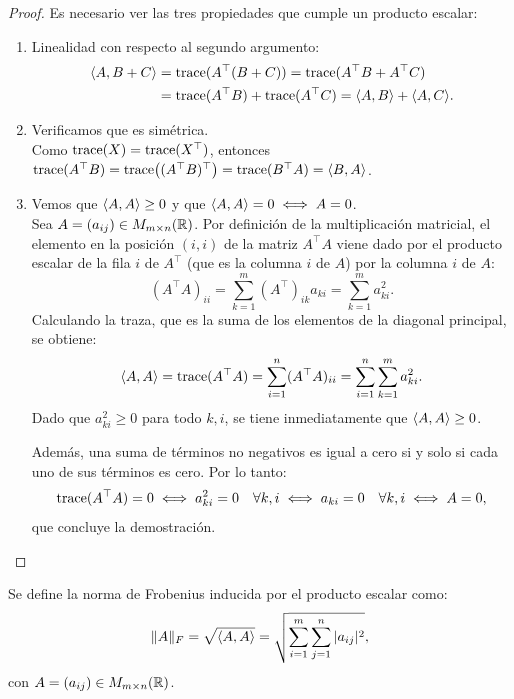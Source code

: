 \begin{proof}
	Es necesario ver las tres propiedades que cumple un producto escalar:
	\begin{enumerate}
		\item Linealidad con respecto al segundo argumento:
		      \begin{align*}
			      \langle A, B+C\rangle & = \operatorname{trace}(A^{\top} (B+C)) = \operatorname{trace}(A^{\top} B + A^{\top} C)       \\
			                  & = \operatorname{trace}(A^{\top} B) + \operatorname{trace}(A^{\top} C) = \langle A,B\rangle + \langle A,C\rangle.
		      \end{align*}
		\item Verificamos que es simétrica. \\
		      Como $\operatorname{trace}(X) = \operatorname{trace}(X^{\top})$, entonces $\tr(A^{\top}B) = \tr\parens*{(A^{\top}B)^{\top}} = \tr(B^{\top} A) = \ip{B, A}$.
		\item Vemos que $\langle A, A\rangle \geq 0$ y que $\langle A, A\rangle = 0 \iff A = 0$. \\
		      Sea $A = (a_{ij}) \in M_{m \times n}(\mathbb{R})$. Por definición de la multiplicación matricial, el elemento en la posición $(i, i)$ de la matriz $A^{\top}A$ viene dado por el producto escalar de la fila $i$ de $A^{\top}$ (que es la columna $i$ de $A$) por la columna $i$ de $A$:
		      \[ (A^{\top} A)_{ii} = \sum_{k=1}^{m} (A^{\top})_{ik} a_{ki} = \sum_{k=1}^{m} a_{ki}^2. \]
		      Calculando la traza, que es la suma de los elementos de la diagonal principal, se obtiene:
		      \[ \langle A, A\rangle = \operatorname{trace}(A^{\top}A) = \sum_{i=1}^{n} (A^{\top} A)_{ii} = \sum_{i=1}^{n} \sum_{k=1}^{m} a_{ki}^2. \]
		      Dado que $a_{ki}^2 \geq 0$ para todo $k, i$, se tiene inmediatamente que $\langle A, A\rangle \geq 0$.

		      Además, una suma de términos no negativos es igual a cero si y solo si cada uno de sus términos es cero. Por lo tanto:
		      \[ \operatorname{trace}(A^{\top}A) = 0 \iff a_{ki}^2 = 0 \quad \forall k, i \iff a_{ki} = 0 \quad \forall k, i \iff A = 0, \]
		      que concluye la demostración.



	\end{enumerate}
\end{proof}

\begin{definition}
	Se define la norma de Frobenius inducida por el producto escalar como:
	\[ \lVert A\rVert_F = \sqrt{\langle A, A\rangle} = \sqrt{\sum_{i=1}^{m}\sum_{j=1}^{n} |a_{ij}|^2}, \]
	con $A = (a_{ij}) \in M_{m \times n}(\mathbb{R})$.
\end{definition}

